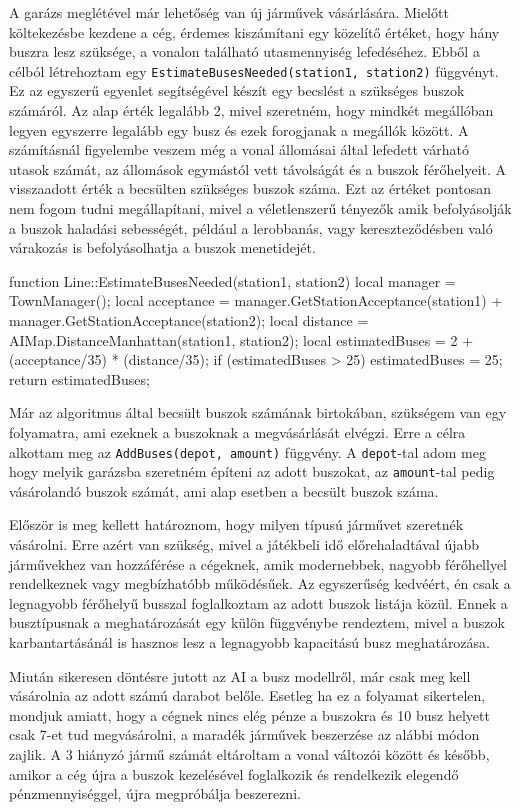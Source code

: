 A garázs meglétével már lehetőség van új járművek vásárlására. Mielőtt költekezésbe kezdene a cég, érdemes kiszámítani egy közelítő értéket, hogy hány buszra lesz szüksége, a vonalon található utasmennyiség lefedéséhez. Ebből a célból létrehoztam egy \texttt{EstimateBusesNeeded(station1, station2)} függvényt. Ez az egyszerű egyenlet segítségével készít egy becslést a szükséges buszok számáról. Az alap érték legalább 2, mivel szeretném, hogy mindkét megállóban legyen egyszerre legalább egy busz és ezek forogjanak a megállók között. A számításnál figyelembe veszem még a vonal állomásai által lefedett várható utasok számát, az állomások egymástól vett távolságát és a buszok férőhelyeit. A visszaadott érték a becsülten szükséges buszok száma. Ezt az értéket pontosan nem fogom tudni megállapítani, mivel a véletlenszerű tényezők amik befolyásolják a buszok haladási sebességét, például a lerobbanás, vagy kereszteződésben való várakozás is befolyásolhatja a buszok menetidejét.

\begin{cpp}
function Line::EstimateBusesNeeded(station1, station2)
{
  local manager = TownManager();
  local acceptance = manager.GetStationAcceptance(station1) +
   manager.GetStationAcceptance(station2);
  local distance = AIMap.DistanceManhattan(station1, station2);
  local estimatedBuses = 2 + (acceptance/35) * (distance/35);
  if (estimatedBuses > 25) {
    estimatedBuses = 25;
  }
  return estimatedBuses;
}
\end{cpp}

Már az algoritmus által becsült buszok számának birtokában, szükségem van egy folyamatra, ami ezeknek a buszoknak a megvásárlását elvégzi. Erre a célra alkottam meg az \texttt{AddBuses(depot, amount)} függvény. A \texttt{depot}-tal adom meg hogy melyik garázsba szeretném építeni az adott buszokat, az \texttt{amount}-tal pedig vásárolandó buszok számát, ami alap esetben a becsült buszok száma.

Először is meg kellett határoznom, hogy milyen típusú járművet szeretnék vásárolni. Erre azért van szükség, mivel a játékbeli idő előrehaladtával újabb járművekhez van hozzáférése a cégeknek, amik modernebbek, nagyobb férőhellyel rendelkeznek vagy megbízhatóbb működésűek. Az egyszerűség kedvéért, én csak a legnagyobb férőhelyű busszal foglalkoztam az adott buszok listája közül. Ennek a busztípusnak a meghatározását egy külön függvénybe rendeztem, mivel a buszok karbantartásánál is hasznos lesz a legnagyobb kapacitású busz meghatározása.

Miután sikeresen döntésre jutott az AI a busz modellről, már csak meg kell vásárolnia az adott számú darabot belőle. Esetleg ha ez a folyamat sikertelen, mondjuk amiatt, hogy a cégnek nincs elég pénze a buszokra és 10 busz helyett csak 7-et tud megvásárolni, a maradék járművek beszerzése az alábbi módon zajlik. A 3 hiányzó jármű számát eltároltam a vonal változói között és később, amikor a cég újra a buszok kezelésével foglalkozik és rendelkezik elegendő pénzmennyiséggel, újra megpróbálja beszerezni.

